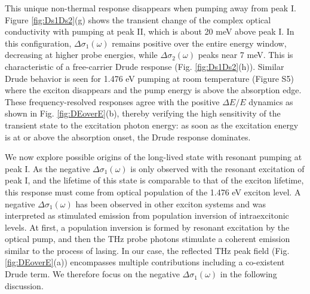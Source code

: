 \documentclass[%
 reprint,
superscriptaddress,
 amsmath,amssymb,
 aps,
]{revtex4-2}
\begin{document}
This unique non-thermal response disappears when pumping away from peak I. Figure \ref{fig:Ds1Ds2}(g) shows the transient change of the complex optical conductivity with pumping at peak II, which is about 20 meV above peak I. In this configuration, $\Delta\sigma_1(\omega)$ remains positive over the entire energy window, decreasing at higher probe energies, while $\Delta\sigma_2(\omega)$ peaks near 7 meV. This is characteristic of a free-carrier Drude response (Fig. \ref{fig:Ds1Ds2}(h))\cite{Dressel2002}. Similar Drude behavior is seen for 1.476 eV pumping at room temperature (Figure S5) where the exciton disappears and the pump energy is above the absorption edge. These frequency-resolved responses agree with the positive $\Delta E/E$ dynamics as shown in Fig. \ref{fig:DEoverE}(b), thereby verifying the high sensitivity of the transient state to the excitation photon energy: as soon as the excitation energy is at or above the absorption onset, the Drude response dominates. 




We now explore possible origins of the long-lived state with resonant pumping at peak I. As the negative $\Delta\sigma_1(\omega)$ is only observed with the resonant excitation of peak I, and the lifetime of this state is comparable to that of the exciton lifetime\cite{Wang2021,Hwangbo2021,Li2024}, this response must come from optical population of the 1.476 eV exciton level. A negative $\Delta\sigma_1(\omega)$ has been observed in other exciton systems and was interpreted as stimulated emission from population inversion of intraexcitonic levels\cite{Huber2006}. At first, a population inversion is formed by resonant excitation by the optical pump, and then the THz probe photons stimulate a coherent emission similar to the process of lasing. In our case, the reflected THz peak field (Fig. \ref{fig:DEoverE}(a)) encompasses multiple contributions including a co-existent Drude term. We therefore focus on the negative $\Delta\sigma_1(\omega)$ in the following discussion. 
\end{document}
